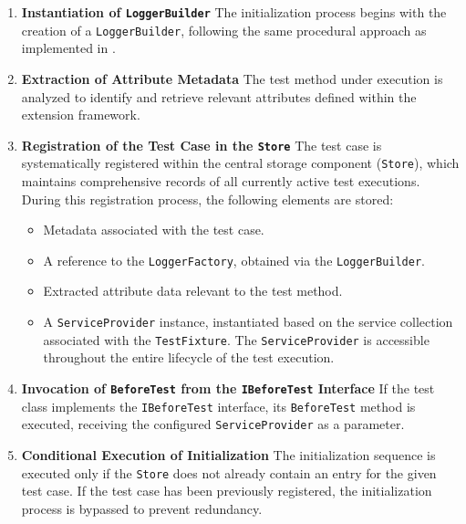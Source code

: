 \begin{enumerate}
    \item \textbf{Instantiation of \texttt{LoggerBuilder}}  
        The initialization process begins with the creation of a \texttt{LoggerBuilder}, following the same procedural approach as implemented in .

    \item \textbf{Extraction of Attribute Metadata}  
        The test method under execution is analyzed to identify and retrieve relevant attributes defined within the extension framework.

    \item \textbf{Registration of the Test Case in the \texttt{Store}}  
        The test case is systematically registered within the central storage component (\texttt{Store}), which maintains comprehensive records of all currently active test executions. During this registration process, the following elements are stored:
        \begin{itemize}
            \item Metadata associated with the test case.
            \item A reference to the \texttt{LoggerFactory}, obtained via the \texttt{LoggerBuilder}.
            \item Extracted attribute data relevant to the test method.
            \item A \texttt{ServiceProvider} instance, instantiated based on the service collection associated with the \texttt{TestFixture}.
            The \texttt{ServiceProvider} is accessible throughout the entire lifecycle of the test execution.
        \end{itemize}
     
    \item \textbf{Invocation of \texttt{BeforeTest} from the \texttt{IBeforeTest} Interface}  
        If the test class implements the \texttt{IBeforeTest} interface, its \texttt{BeforeTest} method is executed, receiving the configured \texttt{ServiceProvider} as a parameter.

    \item \textbf{Conditional Execution of Initialization}  
        The initialization sequence is executed only if the \texttt{Store} does not already contain an entry for the given test case. If the test case has been previously registered, the initialization process is bypassed to prevent redundancy.
\end{enumerate}

